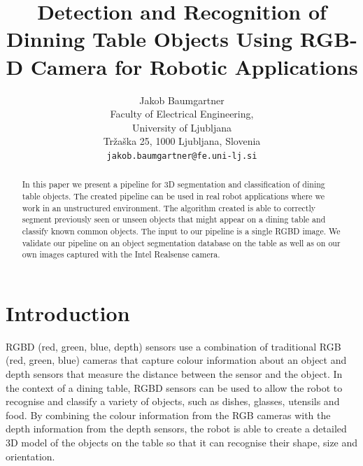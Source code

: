 \documentclass[10pt,twocolumn,letterpaper]{article}
\begin{document}
\title{Detection and Recognition of Dinning Table Objects Using RGB-D Camera for Robotic Applications}

\author{Jakob Baumgartner\\
Faculty of Electrical Engineering,\\
University of Ljubljana\\
Tržaška 25, 1000 Ljubljana, Slovenia\\
{\tt\small jakob.baumgartner@fe.uni-lj.si}
}

\maketitle
\ificcvfinal\thispagestyle{empty}\fi

\begin{abstract}
In this paper we present a pipeline for 3D segmentation and classification of dining table objects. The created pipeline can be used in real robot applications where we work in an unstructured environment. The algorithm created is able to correctly segment previously seen or unseen objects that might appear on a dining table and classify known common objects. The input to our pipeline is a single RGBD image. We validate our pipeline on an object segmentation database on the table as well as on our own images captured with the Intel Realsense camera.




\end{abstract}

\section{Introduction}


RGBD (red, green, blue, depth) sensors \cite{Tychola_Tsimperidis_Papakostas_2022} use a combination of traditional RGB (red, green, blue) cameras that capture colour information about an object and depth sensors that measure the distance between the sensor and the object. In the context of a dining table, RGBD sensors can be used to allow the robot to recognise and classify a variety of objects, such as dishes, glasses, utensils and food. By combining the colour information from the RGB cameras with the depth information from the depth sensors, the robot is able to create a detailed 3D model of the objects on the table so that it can recognise their shape, size and orientation.
\end{document}
